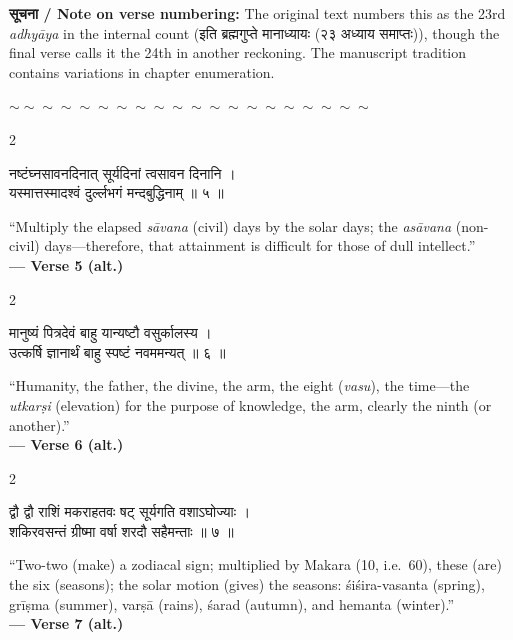 \documentclass[11pt,a4paper]{article}
\newcommand{\dev}[1]{{\devanagarifont #1}}
\newenvironment{bilingualverse}{%
  \begin{paracol}{2}
  \fontsize{10.5}{13}\selectfont
}{%
  \end{paracol}
  \vspace{0.3cm}
}
\newcommand{\wavydivider}{\begin{center}$\sim\sim\sim\sim\sim\sim\sim\sim\sim\sim\sim\sim\sim\sim\sim\sim\sim\sim\sim\sim$\end{center}}
\begin{document}
\vspace{0.3cm}

\textbf{\dev{सूचना} / Note on verse numbering:} The original text numbers this as the 23rd \textit{adhyāya} in the internal count (\dev{इति ब्रह्मगुप्ते मानाध्यायः (२३ अध्याय समाप्तः)}), though the final verse calls it the 24th in another reckoning. The manuscript tradition contains variations in chapter enumeration.

\wavydivider

\begin{bilingualverse}
\begin{leftcolumn*}
\dev{नष्टंघ्नसावनदिनात् सूर्यदिनां त्वसावन दिनानि ।}\\
\dev{यस्मात्तस्मादश्वं दुर्ल्लभगं मन्दबुद्धिनाम् ॥ ५ ॥}
\end{leftcolumn*}
\begin{rightcolumn}
``Multiply the elapsed \textit{sāvana} (civil) days by the solar days; the \textit{asāvana} (non-civil) days---therefore, that attainment is difficult for those of dull intellect.''\\[0.3cm]
\hfill\textbf{— Verse 5 (alt.)}
\end{rightcolumn}
\end{bilingualverse}

\begin{bilingualverse}
\begin{leftcolumn*}
\dev{मानुष्यं पित्रदेवं बाहु यान्यष्टौ वसुर्कालस्य ।}\\
\dev{उत्कर्षि ज्ञानार्थं बाहु स्पष्टं नवममन्यत् ॥ ६ ॥}
\end{leftcolumn*}
\begin{rightcolumn}
``Humanity, the father, the divine, the arm, the eight (\textit{vasu}), the time---the \textit{utkarṣi} (elevation) for the purpose of knowledge, the arm, clearly the ninth (or another).''\\[0.3cm]
\hfill\textbf{— Verse 6 (alt.)}
\end{rightcolumn}
\end{bilingualverse}

\begin{bilingualverse}
\begin{leftcolumn*}
\dev{द्वौ द्वौ राशिं मकराहतवः षट् सूर्यगति वशाऽघोज्याः ।}\\
\dev{शकिरवसन्तं ग्रीष्मा वर्षा शरदौ सहैमन्ताः ॥ ७ ॥}
\end{leftcolumn*}
\begin{rightcolumn}
``Two-two (make) a zodiacal sign; multiplied by Makara (10, i.e.\ 60), these (are) the six (seasons); the solar motion (gives) the seasons: śiśira-vasanta (spring), grīṣma (summer), varṣā (rains), śarad (autumn), and hemanta (winter).''\\[0.3cm]
\hfill\textbf{— Verse 7 (alt.)}
\end{rightcolumn}
\end{bilingualverse}
\end{document}
